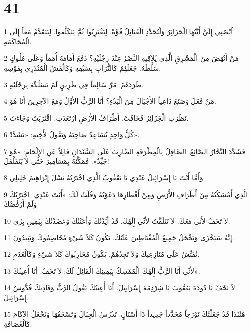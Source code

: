\chapter{41}

\par 1 اُنْصُتِي إِلَيَّ أَيَّتُهَا الْجَزَائِرُ وَلْتُجَدِّدِ الْقَبَائِلُ قُوَّةً. لِيَقْتَرِبُوا ثُمَّ يَتَكَلَّمُوا. لِنَتَقَدَّمْ مَعاً إِلَى الْمُحَاكَمَةِ.
\par 2 مَنْ أَنْهَضَ مِنَ الْمَشْرِقِ الَّذِي يُلاَقِيهِ النَّصْرُ عِنْدَ رِجْلَيْهِ؟ دَفَعَ أَمَامَهُ أُمَماً وَعَلَى مُلُوكٍ سَلَّطَهُ. جَعَلَهُمْ كَالتُّرَابِ بِسَيْفِهِ وَكَالْقَشِّ الْمُنْذَرِي بِقَوْسِهِ.
\par 3 طَرَدَهُمْ. مَرَّ سَالِماً فِي طَرِيقٍ لَمْ يَسْلُكْهُ بِرِجْلَيْهِ.
\par 4 مَنْ فَعَلَ وَصَنَعَ دَاعِياً الأَجْيَالَ مِنَ الْبَدْءِ؟ أَنَا الرَّبُّ الأَوَّلُ وَمَعَ الآخِرِينَ أَنَا هُوَ.
\par 5 نَظَرَتِ الْجَزَائِرُ فَخَافَتْ. أَطْرَافُ الأَرْضِ ارْتَعَدَتِ. اقْتَرَبَتْ وَجَاءَتْ.
\par 6 كُلُّ وَاحِدٍ يُسَاعِدُ صَاحِبَهُ وَيَقُولُ لأَخِيهِ: «تَشَدَّدْ».
\par 7 فَشَدَّدَ النَّجَّارُ الصَّائِغَ. الصَّاقِلُ بِالْمِطْرَقَةِ الضَّارِبَ عَلَى السَّنْدَانِ قَائِلاً عَنِ الإِلْحَامِ: «هُوَ جَيِّدٌ». فَمَكَّنَهُ بِمَسَامِيرَ حَتَّى لاَ يَتَقَلْقَلَ!
\par 8 وَأَمَّا أَنْتَ يَا إِسْرَائِيلُ عَبْدِي يَا يَعْقُوبُ الَّذِي اخْتَرْتُهُ نَسْلَ إِبْرَاهِيمَ خَلِيلِي
\par 9 الَّذِي أَمْسَكْتُهُ مِنْ أَطْرَافِ الأَرْضِ وَمِنْ أَقْطَارِهَا دَعَوْتُهُ وَقُلْتُ لَكَ: «أَنْتَ عَبْدِي. اخْتَرْتُكَ وَلَمْ أَرْفُضْكَ
\par 10 لاَ تَخَفْ لأَنِّي مَعَكَ. لاَ تَتَلَفَّتْ لأَنِّي إِلَهُكَ. قَدْ أَيَّدْتُكَ وَأَعَنْتُكَ وَعَضَدْتُكَ بِيَمِينِ بِرِّي.
\par 11 إِنَّهُ سَيَخْزَى وَيَخْجَلُ جَمِيعُ الْمُغْتَاظِينَ عَلَيْكَ. يَكُونُ كَلاَ شَيْءٍ مُخَاصِمُوكَ وَيَبِيدُونَ.
\par 12 تُفَتِّشُ عَلَى مُنَازِعِيكَ وَلاَ تَجِدُهُمْ. يَكُونُ مُحَارِبُوكَ كَلاَ شَيْءٍ وَكَالْعَدَمِ.
\par 13 لأَنِّي أَنَا الرَّبُّ إِلَهُكَ الْمُمْسِكُ بِيَمِينِكَ الْقَائِلُ لَكَ: لاَ تَخَفْ. أَنَا أُعِينُكَ».
\par 14 لاَ تَخَفْ يَا دُودَةَ يَعْقُوبَ يَا شِرْذِمَةَ إِسْرَائِيلَ. أَنَا أُعِينُكَ يَقُولُ الرَّبُّ وَفَادِيكَ قُدُّوسُ إِسْرَائِيلَ.
\par 15 هَئَنَذَا قَدْ جَعَلْتُكَ نَوْرَجاً مُحَدَّداً جَدِيداً ذَا أَسْنَانٍ. تَدْرُسُ الْجِبَالَ وَتَسْحَقُهَا وَتَجْعَلُ الآكَامَ كَالْعُصَافَةِ.
